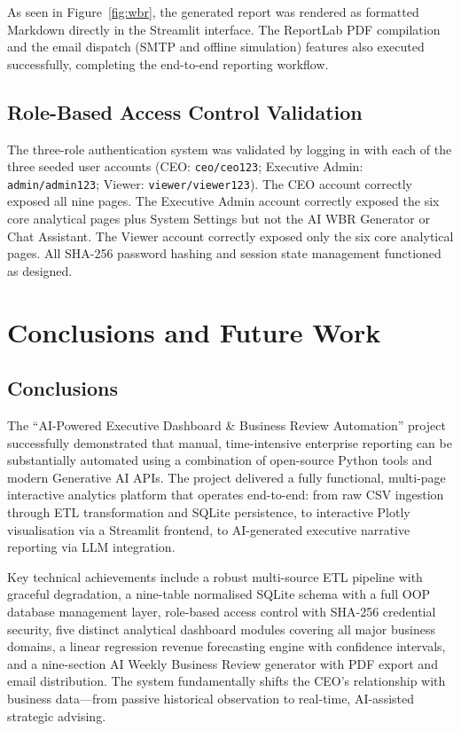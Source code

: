 \documentclass{book}
\begin{document}
\par\noindent
As seen in Figure~\ref{fig:wbr}, the generated report was rendered as formatted Markdown directly in the Streamlit interface. The ReportLab PDF compilation and the email dispatch (SMTP and offline simulation) features also executed successfully, completing the end-to-end reporting workflow.

\section{Role-Based Access Control Validation}
The three-role authentication system was validated by logging in with each of the three seeded user accounts (CEO: \texttt{ceo/ceo123}; Executive Admin: \texttt{admin/admin123}; Viewer: \texttt{viewer/viewer123}). The CEO account correctly exposed all nine pages. The Executive Admin account correctly exposed the six core analytical pages plus System Settings but not the AI WBR Generator or Chat Assistant. The Viewer account correctly exposed only the six core analytical pages. All SHA-256 password hashing and session state management functioned as designed.




\chapter{Conclusions and Future Work}

\section{Conclusions}
The ``AI-Powered Executive Dashboard \& Business Review Automation'' project successfully demonstrated that manual, time-intensive enterprise reporting can be substantially automated using a combination of open-source Python tools and modern Generative AI APIs. The project delivered a fully functional, multi-page interactive analytics platform that operates end-to-end: from raw CSV ingestion through ETL transformation and SQLite persistence, to interactive Plotly visualisation via a Streamlit frontend, to AI-generated executive narrative reporting via LLM integration.

\par\noindent
Key technical achievements include a robust multi-source ETL pipeline with graceful degradation, a nine-table normalised SQLite schema with a full OOP database management layer, role-based access control with SHA-256 credential security, five distinct analytical dashboard modules covering all major business domains, a linear regression revenue forecasting engine with confidence intervals, and a nine-section AI Weekly Business Review generator with PDF export and email distribution. The system fundamentally shifts the CEO's relationship with business data---from passive historical observation to real-time, AI-assisted strategic advising.
\end{document}
